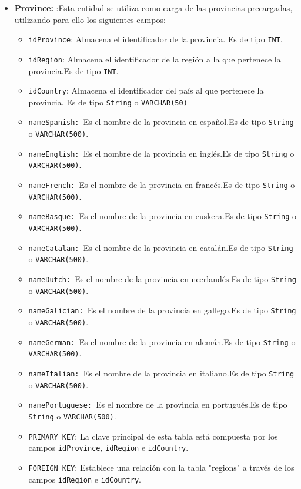 \begin{itemize}

      \item \textbf{Province: }:Esta entidad se utiliza como carga de las provincias precargadas, utilizando para ello los siguientes campos:
      \begin{itemize}
        \item \texttt{idProvince}: Almacena el identificador de la provincia. Es de tipo \texttt{INT}.
        \item \texttt{idRegion}: Almacena el identificador de la región a la que pertenece la provincia.Es de tipo \texttt{INT}.
        \item \texttt{idCountry}: Almacena el identificador del país al que pertenece la provincia. Es de tipo \texttt{String} o \texttt{VARCHAR(50)}
        \item \texttt{nameSpanish: }Es el nombre de la provincia en español.Es de tipo \texttt{String} o \texttt{VARCHAR(500)}.
        \item \texttt{nameEnglish: }Es el nombre de la provincia en inglés.Es de tipo \texttt{String} o \texttt{VARCHAR(500)}.
        \item \texttt{nameFrench: }Es el nombre de la provincia en francés.Es de tipo \texttt{String} o \texttt{VARCHAR(500)}.
        \item \texttt{nameBasque: }Es el nombre de la provincia en euskera.Es de tipo \texttt{String} o \texttt{VARCHAR(500)}.
        \item \texttt{nameCatalan: }Es el nombre de la provincia en catalán.Es de tipo \texttt{String} o \texttt{VARCHAR(500)}.
        \item \texttt{nameDutch: }Es el nombre de la provincia en neerlandés.Es de tipo \texttt{String} o \texttt{VARCHAR(500)}.
        \item \texttt{nameGalician: }Es el nombre de la provincia en gallego.Es de tipo \texttt{String} o \texttt{VARCHAR(500)}.
        \item \texttt{nameGerman: }Es el nombre de la provincia en alemán.Es de tipo \texttt{String} o \texttt{VARCHAR(500)}.
        \item \texttt{nameItalian: }Es el nombre de la provincia en italiano.Es de tipo \texttt{String} o \texttt{VARCHAR(500)}.
        \item \texttt{namePortuguese: }Es el nombre de la provincia en portugués.Es de tipo \texttt{String} o \texttt{VARCHAR(500)}.       
        \item \texttt{PRIMARY KEY}: La clave principal de esta tabla está compuesta por los campos \texttt{idProvince}, \texttt{idRegion} e \texttt{idCountry}.
        \item \texttt{FOREIGN KEY}: Establece una relación con la tabla "regions" a través de los campos \texttt{idRegion} e \texttt{idCountry}.
      \end{itemize}


\end{itemize}
